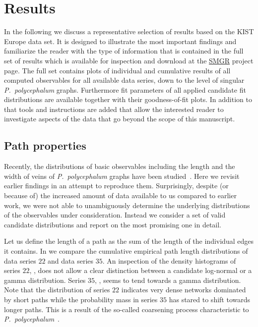 \section{Results}	%

	In the following we discuss a representative selection of results based on the KIST Europe data set. It is designed to illustrate the most important findings and familiarize the reader with the type of information that is contained in the full set of results which is available for inspection and download at the \href{http://smgr.mpi-inf.mpg.de}{SMGR} project page. The full set contains plots of individual and cumulative results of all computed observables for all available data series, down to the level of singular \emph{P.~polycephalum} graphs. Furthermore fit parameters of all applied candidate fit distributions are available together with their goodness-of-fit plots. In addition to that tools and instructions are added that allow the interested reader to investigate aspects of the data that go beyond the scope of this manuscript.

	\subsection{Path properties}

		Recently, the distributions of basic observables including the length and the width of veins of \emph{P.~polycephalum} graphs have been studied~\cite{baumgarten2010plasmodial}. Here we revisit earlier findings in an attempt to reproduce them. Surprisingly, despite (or because of) the increased amount of data available to us compared to earlier work, we were not able to unambiguously determine the underlying distributions of the observables under consideration. Instead we consider a set of valid candidate distributions and report on the most promising one in detail. 

		Let us define the length of a path as the sum of the length of the individual edges it contains. In  we compare the cumulative empirical path length distributions of data series $22$ and data series $35$. An inspection of the density histograms of series $22$, , does not allow a clear distinction between a candidate log-normal or a gamma distribution. Series $35$, , seems to tend towards a gamma distribution. Note that the distribution of series $22$ indicates very dense networks dominated by short paths while the probability mass in series $35$ has stared to shift towards longer paths. This is a result of the so-called coarsening process characteristic to \emph{P.~polycephalum}~\cite{baumgarten2010plasmodial}.

